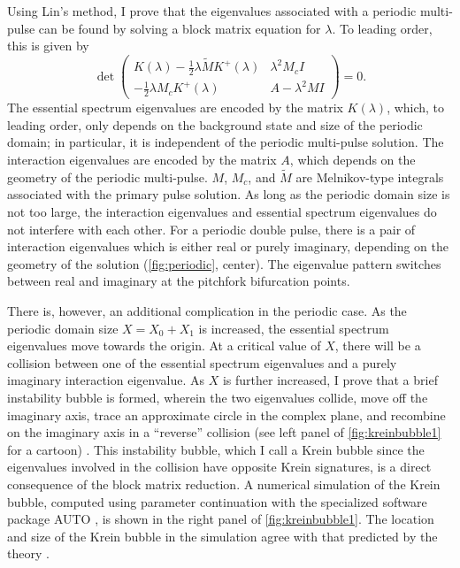 \documentclass[12pt,reqno,oneside,hidelinks]{article}
\begin{document}
Using Lin's method, I prove that the eigenvalues associated with a periodic multi-pulse can be found by solving a block matrix equation \cite[Theorem 5.3]{ParkerKdV} for $\lambda$. To leading order, this is given by
    \begin{equation}\label{blockmatrix}
    \det \begin{pmatrix}
    K(\lambda) - \frac{1}{2} \lambda \tilde{M} K^+(\lambda) & \lambda^2 M_c I \\
    -\frac{1}{2} \lambda M_c K^+(\lambda) & A - \lambda^2 MI  
    \end{pmatrix} = 0.
    \end{equation}
The essential spectrum eigenvalues are encoded by the matrix $K(\lambda)$, which, to leading order, only depends on the background state and size of the periodic domain; in particular, it is independent of the periodic multi-pulse solution. The interaction eigenvalues are encoded by the matrix $A$, which depends on the geometry of the periodic multi-pulse. $M$, $M_c$, and $\tilde{M}$ are Melnikov-type integrals associated with the primary pulse solution. As long as the periodic domain size is not too large, the interaction eigenvalues and essential spectrum eigenvalues do not interfere with each other. For a periodic double pulse, there is a pair of interaction eigenvalues which is either real or purely imaginary, depending on the geometry of the solution (\cref{fig:periodic}, center). The eigenvalue pattern switches between real and imaginary at the pitchfork bifurcation points.  
    
There is, however, an additional complication in the periodic case. As the periodic domain size $X = X_0 + X_1$ is increased, the essential spectrum eigenvalues move towards the origin. At a critical value of $X$,  there will be a collision between one of the essential spectrum eigenvalues and a purely imaginary interaction eigenvalue. As $X$ is further increased, I prove that a brief instability bubble is formed, wherein the two eigenvalues collide, move off the imaginary axis, trace an approximate circle in the complex plane, and recombine on the imaginary axis in a ``reverse'' collision (see left panel of \cref{fig:kreinbubble1} for a cartoon) \cite[Theorem 5.10]{ParkerKdV}. This instability bubble, which I call a Krein bubble since the eigenvalues involved in the collision have opposite Krein signatures, is a direct consequence of the block matrix reduction. A numerical simulation of the Krein bubble, computed using parameter continuation with the specialized software package AUTO \cite{AUTO}, is shown in the right panel of \cref{fig:kreinbubble1}. The location and size of the Krein bubble in the simulation agree with that predicted by the theory \cite{ParkerKdV}.
    
\end{document}
